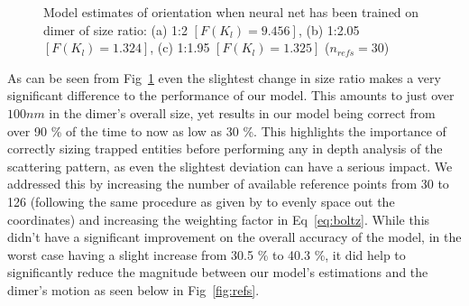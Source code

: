 \documentclass[final,  3p]{elsarticle}
\begin{document}
\begin{figure}[h]
\begin{subfigure}{0.31\textwidth}
	\end{subfigure}
	\caption{Model estimates of orientation when neural net has been trained on dimer of size ratio: (a) 1:2 $[F(K_l)=9.456]$, (b) 1:2.05 $[F(K_l)=1.324]$, (c) 1:1.95 $[F(K_l)=1.325]$ ($n_{refs} = 30$)}
	\label{fig:size}
\end{figure}
As can be seen from Fig~\ref{fig:size}  even the slightest change in size ratio makes a very significant difference to the performance of our model. This amounts to just over $100 nm$ in the dimer's overall size, yet results in our model being correct from over 90 \% of the time to now as low as 30 \%. This highlights the importance of correctly sizing trapped entities before performing any in depth analysis of the scattering pattern, as even the slightest deviation can have a serious impact. We addressed this by increasing the number of available reference points from 30 to 126 (following the same procedure as given by \cite{Rey2006} to evenly space out the coordinates) and increasing the weighting factor in Eq~\ref{eq:boltz}. While this didn't have a significant improvement on the overall accuracy of the model, in the worst case having a slight increase from 30.5 \% to 40.3 \%, it did help to significantly reduce the magnitude between our model's estimations and the dimer's motion as seen below in Fig~\ref{fig:refs}.
\end{document}
